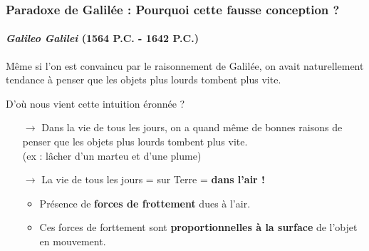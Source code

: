 \documentclass[usenames, dvipsnames, no-framenumber]{beamer}
\begin{document}
\begin{frame}%
\frametitle{Paradoxe de Galilée : Pourquoi cette fausse conception ?}
\framesubtitle{\textit{Galileo Galilei} (1564 P.C. - 1642 P.C.)}

Même si l'on est convaincu par le raisonnement de Galilée, on avait naturellement tendance à penser que les objets plus lourds tombent plus vite.

D'où nous vient cette intuition éronnée ?

\begin{itemize}
\item[$\boldsymbol{\rightarrow}$] Dans la vie de tous les jours, on a quand même de bonnes raisons de penser que les objets plus lourds tombent plus vite. \\ (ex : lâcher d'un marteu et d'une plume)
\item[$\boldsymbol{\rightarrow}$] La vie de tous les jours = sur Terre = \textbf{dans l'air !}
\begin{itemize}
\item Présence de \textbf{forces de frottement} dues à l'air.
\item Ces forces de forttement sont \textbf{proportionnelles à la surface} de l'objet en mouvement.
\end{itemize}
\end{itemize}

\end{frame}
\end{document}
